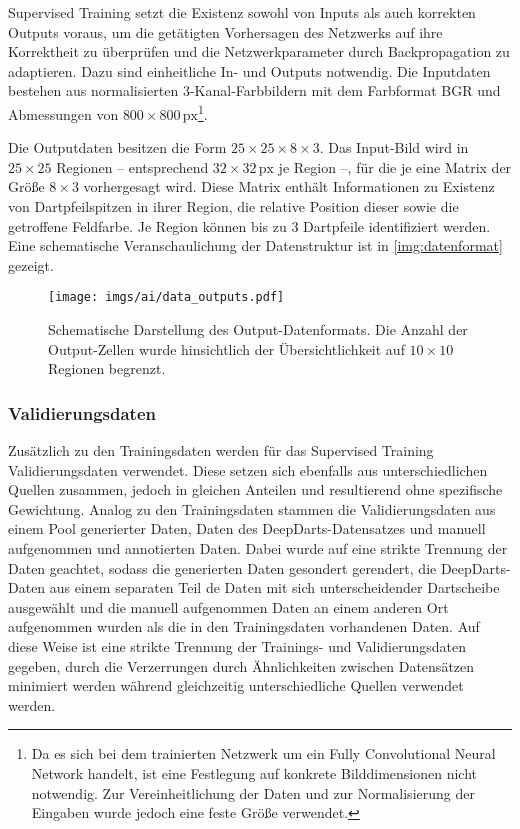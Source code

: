 Supervised Training setzt die Existenz sowohl von Inputs als auch korrekten Outputs voraus, um die getätigten Vorhersagen des Netzwerks auf ihre Korrektheit zu überprüfen und die Netzwerkparameter durch Backpropagation zu adaptieren. Dazu sind einheitliche In- und Outputs notwendig. Die Inputdaten bestehen aus normalisierten 3-Kanal-Farbbildern mit dem Farbformat BGR und Abmessungen von $800 \times 800\,\text{px}$\footnote{Da es sich bei dem trainierten Netzwerk um ein Fully Convolutional Neural Network handelt, ist eine Festlegung auf konkrete Bilddimensionen nicht notwendig. Zur Vereinheitlichung der Daten und zur Normalisierung der Eingaben wurde jedoch eine feste Größe verwendet.}.

Die Outputdaten besitzen die Form $25 \times 25 \times 8 \times 3$. Das Input-Bild wird in $25 \times 25$ Regionen -- entsprechend $32 \times 32\,\text{px}$ je Region --, für die je eine Matrix der Größe $8 \times 3$ vorhergesagt wird. Diese Matrix enthält Informationen zu Existenz von Dartpfeilspitzen in ihrer Region, die relative Position dieser sowie die getroffene Feldfarbe. Je Region können bis zu 3 Dartpfeile identifiziert werden. Eine schematische Veranschaulichung der Datenstruktur ist in \autoref{img:datenformat} gezeigt.

\begin{figure}
    \centering
    \texttt{[image: imgs/ai/data\_outputs.pdf]}
    \caption{Schematische Darstellung des Output-Datenformats. Die Anzahl der Output-Zellen wurde hinsichtlich der Übersichtlichkeit auf $10 \times 10$ Regionen begrenzt.}
    \label{img:datenformat}
\end{figure}

\subsubsection{Validierungsdaten}
\label{sec:validierungsdaten}

Zusätzlich zu den Trainingsdaten werden für das Supervised Training Validierungsdaten verwendet. Diese setzen sich ebenfalls aus unterschiedlichen Quellen zusammen, jedoch in gleichen Anteilen und resultierend ohne spezifische Gewichtung. Analog zu den Trainingsdaten stammen die Validierungsdaten aus einem Pool generierter Daten, Daten des DeepDarts-Datensatzes und manuell aufgenommen und annotierten Daten. Dabei wurde auf eine strikte Trennung der Daten geachtet, sodass die generierten Daten gesondert gerendert, die DeepDarts-Daten aus einem separaten Teil de Daten mit sich unterscheidender Dartscheibe ausgewählt und die manuell aufgenommen Daten an einem anderen Ort aufgenommen wurden als die in den Trainingsdaten vorhandenen Daten. Auf diese Weise ist eine strikte Trennung der Trainings- und Validierungsdaten gegeben, durch die Verzerrungen durch Ähnlichkeiten zwischen Datensätzen minimiert werden während gleichzeitig unterschiedliche Quellen verwendet werden.


